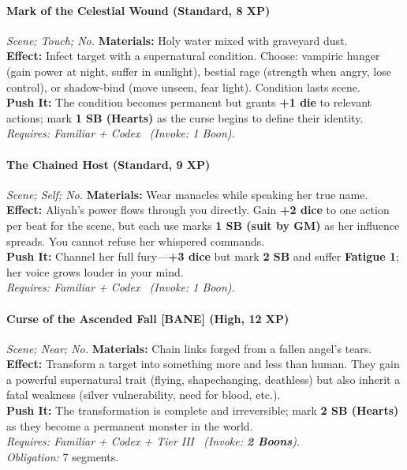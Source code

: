 \paragraph{Mark of the Celestial Wound (Standard, 8 XP)} \emph{Scene; Touch; No.}
\textbf{Materials:} Holy water mixed with graveyard dust.\\
\textbf{Effect:} Infect target with a supernatural condition. Choose: vampiric hunger (gain power at night, suffer in sunlight), bestial rage (strength when angry, lose control), or shadow-bind (move unseen, fear light). Condition lasts scene.\\
\textbf{Push It:} The condition becomes permanent but grants \textbf{+1 die} to relevant actions; mark \textbf{1 SB (Hearts)} as the curse begins to define their identity.\\
\emph{Requires: Familiar + Codex \ (\textit{Invoke:} 1 Boon).}

\paragraph{The Chained Host (Standard, 9 XP)} \emph{Scene; Self; No.}
\textbf{Materials:} Wear manacles while speaking her true name.\\
\textbf{Effect:} Aliyah's power flows through you directly. Gain \textbf{+2 dice} to one action per beat for the scene, but each use marks \textbf{1 SB (suit by GM)} as her influence spreads. You cannot refuse her whispered commands.\\
\textbf{Push It:} Channel her full fury—\textbf{+3 dice} but mark \textbf{2 SB} and suffer \textbf{Fatigue 1}; her voice grows louder in your mind.\\
\emph{Requires: Familiar + Codex \ (\textit{Invoke:} 1 Boon).}

\paragraph{Curse of the Ascended Fall \textnormal{[BANE]} (High, 12 XP)} \emph{Scene; Near; No.}
\textbf{Materials:} Chain links forged from a fallen angel's tears.\\
\textbf{Effect:} Transform a target into something more and less than human. They gain a powerful supernatural trait (flying, shapechanging, deathless) but also inherit a fatal weakness (silver vulnerability, need for blood, etc.).\\
\textbf{Push It:} The transformation is complete and irreversible; mark \textbf{2 SB (Hearts)} as they become a permanent monster in the world.\\
\emph{Requires: Familiar + Codex + Tier III \ (\textit{Invoke:} \textbf{2 Boons}).}\\
\emph{Obligation:} 7 segments.

